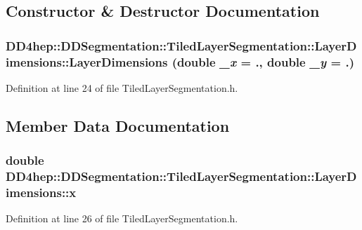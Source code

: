 \subsection{Constructor \& Destructor Documentation}
\hypertarget{struct_d_d4hep_1_1_d_d_segmentation_1_1_tiled_layer_segmentation_1_1_layer_dimensions_a947970ce64990889e5766b397fd0908e}{
\subsubsection[{LayerDimensions}]{\setlength{\rightskip}{0pt plus 5cm}DD4hep::DDSegmentation::TiledLayerSegmentation::LayerDimensions::LayerDimensions (double {\em \_\-x} = {.}, \/  double {\em \_\-y} = {.})}}
\label{struct_d_d4hep_1_1_d_d_segmentation_1_1_tiled_layer_segmentation_1_1_layer_dimensions_a947970ce64990889e5766b397fd0908e}


Definition at line 24 of file TiledLayerSegmentation.h.

\subsection{Member Data Documentation}
\hypertarget{struct_d_d4hep_1_1_d_d_segmentation_1_1_tiled_layer_segmentation_1_1_layer_dimensions_ad7a5356dc198baab61c1a34fc38d22fc}{
\subsubsection[{x}]{\setlength{\rightskip}{0pt plus 5cm}double {\bf DD4hep::DDSegmentation::TiledLayerSegmentation::LayerDimensions::x}}}
\label{struct_d_d4hep_1_1_d_d_segmentation_1_1_tiled_layer_segmentation_1_1_layer_dimensions_ad7a5356dc198baab61c1a34fc38d22fc}


Definition at line 26 of file TiledLayerSegmentation.h.

